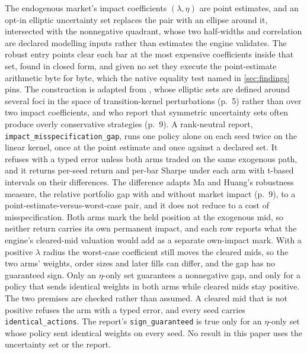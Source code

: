 The endogenous market's impact coefficients $(\lambda,\eta)$ are point estimates, and an opt-in elliptic uncertainty set replaces the pair with an ellipse around it, intersected with the nonnegative quadrant, whose two half-widths and correlation are declared modelling inputs rather than estimates the engine validates. The robust entry points clear each bar at the most expensive coefficients inside that set, found in closed form, and given no set they execute the point-estimate arithmetic byte for byte, which the native equality test named in \cref{sec:findings} pins. The construction is adapted from \citet{ma2025robust}, whose elliptic sets are defined around several foci in the space of transition-kernel perturbations (p.~5) rather than over two impact coefficients, and who report that symmetric uncertainty sets often produce overly conservative strategies (p.~9). A rank-neutral report, \texttt{impact\_misspecification\_gap}, runs one policy alone on each seed twice on the linear kernel, once at the point estimate and once against a declared set. It refuses with a typed error unless both arms traded on the same exogenous path, and it returns per-seed return and per-bar Sharpe under each arm with t-based intervals on their differences. The difference adapts Ma and Huang's robustness measure, the relative portfolio gap with and without market impact (p.~9), to a point-estimate-versus-worst-case pair, and it does not reduce to a cost of misspecification. Both arms mark the held position at the exogenous mid, so neither return carries its own permanent impact, and each row reports what the engine's cleared-mid valuation would add as a separate own-impact mark. With a positive $\lambda$ radius the worst-case coefficient still moves the cleared mids, so the two arms' weights, order sizes and later fills can differ, and the gap has no guaranteed sign. Only an $\eta$-only set guarantees a nonnegative gap, and only for a policy that sends identical weights in both arms while cleared mids stay positive. The two premises are checked rather than assumed. A cleared mid that is not positive refuses the arm with a typed error, and every seed carries \texttt{identical\_actions}. The report's \texttt{sign\_guaranteed} is true only for an $\eta$-only set whose policy sent identical weights on every seed. No result in this paper uses the uncertainty set or the report.

